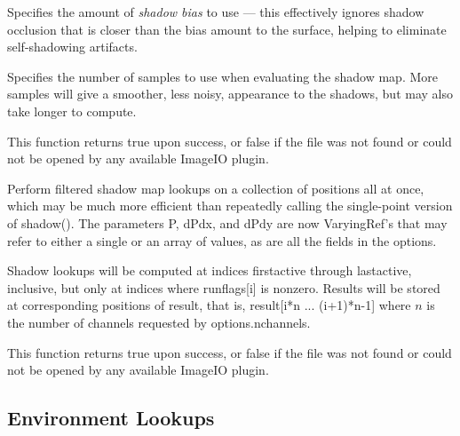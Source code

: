 \vspace{-24pt}
\vspace{10pt}
Specifies the amount of \emph{shadow bias} to use --- this effectively
ignores shadow occlusion that is closer than the bias amount to the
surface, helping to eliminate self-shadowing artifacts.
\apiend

\vspace{-24pt}
\vspace{10pt}
Specifies the number of samples to use when evaluating the shadow map.
More samples will give a smoother, less noisy, appearance to the
shadows, but may also take longer to compute.
\apiend

This function returns {\cf true} upon success, or {\cf false} if the
file was not found or could not be opened by any available ImageIO
plugin.
\apiend


Perform filtered shadow map lookups on a collection of positions all at
once, which may be much more efficient than repeatedly calling the
single-point version of {\cf shadow()}.  The parameters {\cf P},
{\cf dPdx}, and {\cf dPdy} are now
{\cf VaryingRef}'s that may refer to either a single or an array of
values, as are all the fields in the {\cf options}.

Shadow lookups will be computed at indices {\cf firstactive} through
{\cf lastactive}, inclusive, but only at indices where {\cf runflags[i]}
is nonzero.  Results will be stored at corresponding positions of
{\cf result}, that is, {\cf result[i*n ... (i+1)*n-1]} where $n$ 
is the number of channels requested by {\cf options.nchannels}.

This function returns {\cf true} upon success, or {\cf false} if the
file was not found or could not be opened by any available ImageIO
plugin.
\apiend

\newpage
\subsection{Environment Lookups}
\label{sec:texturesys:api:environment}

